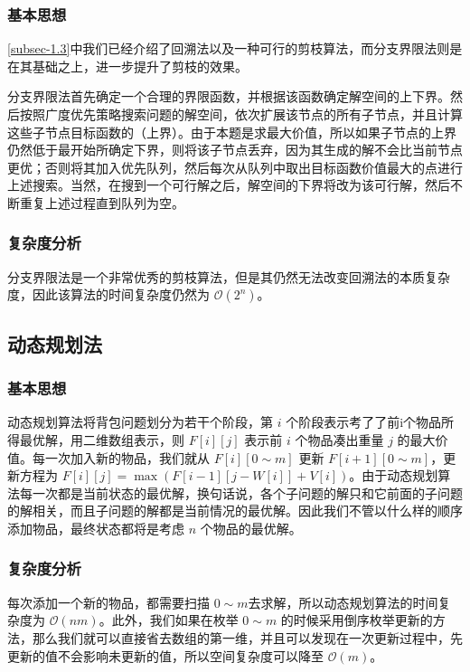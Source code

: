 \documentclass[lang=cn,11pt,a4paper]{elegantpaper}
\begin{document}
\subsubsection{基本思想}
\ref{subsec-1.3}中我们已经介绍了回溯法以及一种可行的剪枝算法，而分支界限法则是在其基础之上，进一步提升了剪枝的效果。

分支界限法首先确定一个合理的界限函数，并根据该函数确定解空间的上下界。然后按照广度优先策略搜索问题的解空间，依次扩展该节点的所有子节点，并且计算这些子节点目标函数的（上界）。由于本题是求最大价值，所以如果子节点的上界仍然低于最开始所确定下界，则将该子节点丢弃，因为其生成的解不会比当前节点更优；否则将其加入优先队列，然后每次从队列中取出目标函数价值最大的点进行上述搜索。当然，在搜到一个可行解之后，解空间的下界将改为该可行解，然后不断重复上述过程直到队列为空。

\subsubsection{复杂度分析}
分支界限法是一个非常优秀的剪枝算法，但是其仍然无法改变回溯法的本质复杂度，因此该算法的时间复杂度仍然为 $\mathcal{O}\left(2^n\right)$。


\subsection{动态规划法}
\subsubsection{基本思想}
动态规划算法将背包问题划分为若干个阶段，第 $i$ 个阶段表示考了了前i个物品所得最优解，用二维数组表示，则 $F[i][j]$ 表示前 $i$ 个物品凑出重量 $j$ 的最大价值。每一次加入新的物品，我们就从 $F[i][0 \sim m]$ 更新 $F[i+1][0 \sim m]$，更新方程为 $F\left[i\right]\left[j\right]=\max{\left(F\left[i-1\right]\left[j-W\left[i\right]\right]+V\left[i\right]\right)}$。由于动态规划算法每一次都是当前状态的最优解，换句话说，各个子问题的解只和它前面的子问题的解相关，而且子问题的解都是当前情况的最优解。因此我们不管以什么样的顺序添加物品，最终状态都将是考虑 $n$ 个物品的最优解。

\subsubsection{复杂度分析}
每次添加一个新的物品，都需要扫描 $0 \sim m$去求解，所以动态规划算法的时间复杂度为 $\mathcal{O}\left(nm\right)$。此外，我们如果在枚举 $0 \sim m$ 的时候采用倒序枚举更新的方法，那么我们就可以直接省去数组的第一维，并且可以发现在一次更新过程中，先更新的值不会影响未更新的值，所以空间复杂度可以降至 $\mathcal{O}\left(m\right)$。
\end{document}
